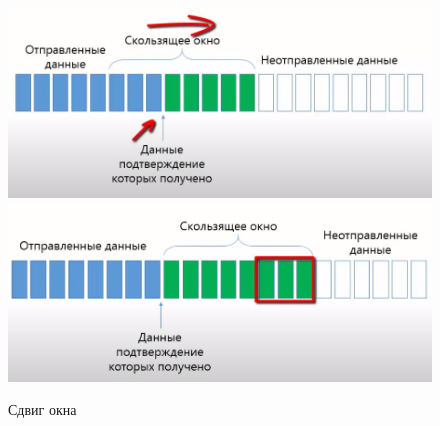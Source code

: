 \begin{figure}[H] \centering
	\includegraphics[scale = 0.4]{18/window_2.png}
	\includegraphics[scale = 0.4]{18/window_3.png}
	\caption{Сдвиг окна}
\end{figure}
